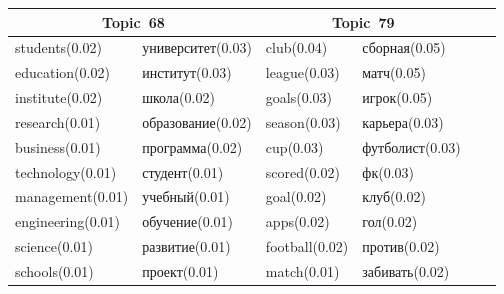 \documentclass[russian]{llncs}
\begin{document}
\begin{table}
	\centering\medskip\tabcolsep=2pt%
	\footnotesize
    \begin{tabular}{|l|l||l|l||l|l|}	
    	\hline
    	\multicolumn{2}{|c||}{\textbf{Topic~68}} & \multicolumn{2}{c||}{\textbf{Topic~79}} \\
    	\hline
    	students(0.02) & университет(0.03) & club(0.04) & сборная(0.05) \\
    	education(0.02) & институт(0.03) & league(0.03) & матч(0.05) \\
    	institute(0.02) & школа(0.02) & goals(0.03) &  игрок(0.05) \\
    	research(0.01) & образование(0.02) & season(0.03) & карьера(0.03) \\
    	business(0.01) & программа(0.02) & cup(0.03) & футболист(0.03) \\
    	technology(0.01) & студент(0.01) & scored(0.02) & фк(0.03) \\
    	management(0.01) & учебный(0.01) & goal(0.02) & клуб(0.02) \\
    	engineering(0.01) & обучение(0.01) & apps(0.02) & гол(0.02) \\
    	science(0.01) & развитие(0.01) & football(0.02) & против(0.02) \\
    	schools(0.01) & проект(0.01) & match(0.01) & забивать(0.02) \\
    	\hline

\end{tabular}
\end{table}
\end{document}
